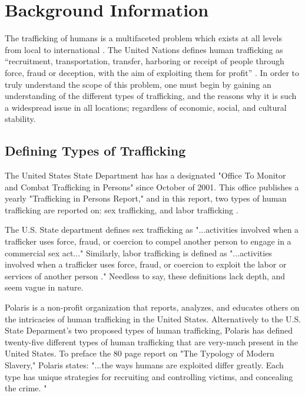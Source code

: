 \documentclass{article} %
\begin{document}
\section{Background Information}

The trafficking of humans is a multifaceted problem which exists at all levels from local to international \parencite{Aromaa2007, JacK2012}. The United Nations defines human trafficking as “recruitment, transportation, transfer, harboring or receipt of people through force, fraud or deception, with the aim of exploiting them for profit” \parencite{Raymond2002}. In order to truly understand the scope of this problem, one must begin by gaining an understanding of the different types of trafficking, and the reasons why it is such a widespread issue in all locations; regardless of economic, social, and cultural stability.

\subsection*{Defining Types of Trafficking}

The United States State Department has has a designated "Office To Monitor and Combat Trafficking in Persons" since October of 2001. This office publishes a yearly "Trafficking in Persons Report," and in this report, two types of human trafficking are reported on: sex trafficking, and labor trafficking \parencite{StateDept}.

The U.S. State department defines sex trafficking as
"...activities involved when a trafficker uses force, fraud, or coercion to compel another person to engage in a commercial sex act..." Similarly, labor trafficking is defined as "...activities involved when a trafficker uses force, fraud, or coercion to exploit the labor or services of another person \parencite{StateDept}." Needless to say, these definitions lack depth, and seem vague in nature.

Polaris is a non-profit organization that reports, analyzes, and educates others on the intricacies of human trafficking in the United States. Alternatively to the U.S. State Deparment's two proposed types of human trafficking, Polaris has defined twenty-five different types of human trafficking that are very-much present in the United States. To preface the 80 page report on "The Typology of Modern Slavery," Polaris states: "...the ways humans are exploited differ greatly. Each type has unique strategies for recruiting and controlling victims, and concealing the crime. \parencite{polarisTypology}"
\end{document}
